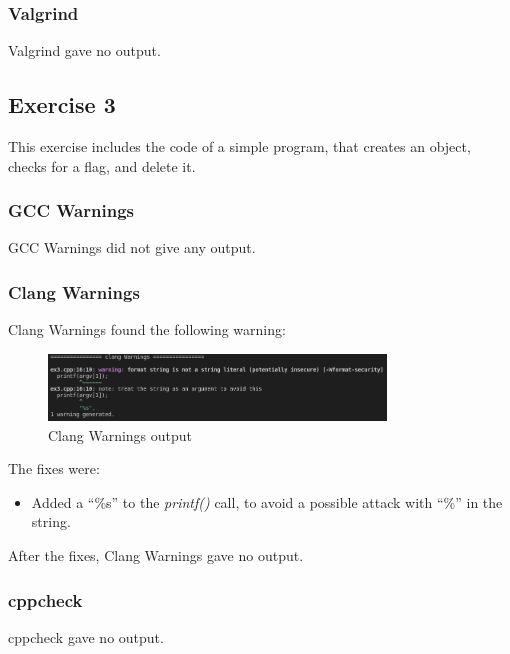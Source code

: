 \documentclass{article}
\begin{document}
\subsubsection{Valgrind}

Valgrind gave no output.

\subsection{Exercise 3}

This exercise includes the code of a simple program, that creates an object, checks for a flag, and delete it.

\subsubsection{GCC Warnings}

GCC Warnings did not give any output.

\subsubsection{Clang Warnings}

Clang Warnings found the following warning:

\begin{figure}[ht!]
    \centering
    \includegraphics[width=0.8\textwidth]{images/ex3/clangWarnings.png}
    \caption{Clang Warnings output}\label{fig:ex3/clangWarnings}
\end{figure}

The fixes were:

\begin{itemize}
    \item Added a ``\%s'' to the \textit{printf()} call, to avoid a possible attack with ``\%'' in the string.
\end{itemize}

After the fixes, Clang Warnings gave no output.

\subsubsection{cppcheck}

cppcheck gave no output.
\end{document}
